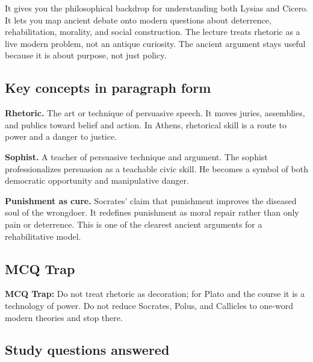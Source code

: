 \documentclass[11pt]{article}
\begin{document}
It gives you the philosophical backdrop for understanding both Lysias and Cicero. It lets you map ancient debate onto modern questions about deterrence, rehabilitation, morality, and social construction. The lecture treats rhetoric as a live modern problem, not an antique curiosity. The ancient argument stays useful because it is about purpose, not just policy.

\subsection{Key concepts in paragraph form}

\textbf{Rhetoric.} The art or technique of persuasive speech. It moves juries, assemblies, and publics toward belief and action. In Athens, rhetorical skill is a route to power and a danger to justice.

\textbf{Sophist.} A teacher of persuasive technique and argument. The sophist professionalizes persuasion as a teachable civic skill. He becomes a symbol of both democratic opportunity and manipulative danger.

\textbf{Punishment as cure.} Socrates' claim that punishment improves the diseased soul of the wrongdoer. It redefines punishment as moral repair rather than only pain or deterrence. This is one of the clearest ancient arguments for a rehabilitative model.

\subsection{MCQ Trap}

\begin{quotebox}
\textbf{MCQ Trap:} Do not treat rhetoric as decoration; for Plato and the course it is a technology of power. Do not reduce Socrates, Polus, and Callicles to one-word modern theories and stop there.
\end{quotebox}

\subsection{Study questions answered}
\end{document}
